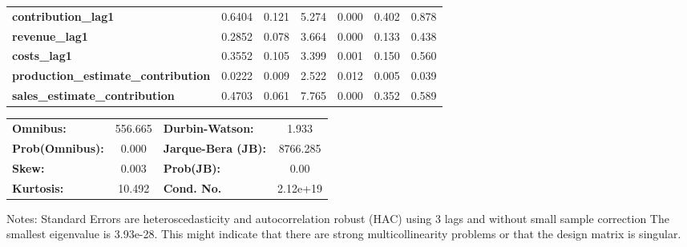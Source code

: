 \begin{center}
\begin{tabular}{lcccccc}
\textbf{contribution\_lag1}                 &       0.6404  &        0.121     &     5.274  &         0.000        &        0.402    &        0.878     \\
\textbf{revenue\_lag1}                      &       0.2852  &        0.078     &     3.664  &         0.000        &        0.133    &        0.438     \\
\textbf{costs\_lag1}                        &       0.3552  &        0.105     &     3.399  &         0.001        &        0.150    &        0.560     \\
\textbf{production\_estimate\_contribution} &       0.0222  &        0.009     &     2.522  &         0.012        &        0.005    &        0.039     \\
\textbf{sales\_estimate\_contribution}      &       0.4703  &        0.061     &     7.765  &         0.000        &        0.352    &        0.589     \\
\bottomrule
\end{tabular}
\begin{tabular}{lclc}
\textbf{Omnibus:}       & 556.665 & \textbf{  Durbin-Watson:     } &    1.933  \\
\textbf{Prob(Omnibus):} &   0.000 & \textbf{  Jarque-Bera (JB):  } & 8766.285  \\
\textbf{Skew:}          &   0.003 & \textbf{  Prob(JB):          } &     0.00  \\
\textbf{Kurtosis:}      &  10.492 & \textbf{  Cond. No.          } & 2.12e+19  \\
\bottomrule
\end{tabular}
\end{center}

Notes: \newline
 [1] Standard Errors are heteroscedasticity and autocorrelation robust (HAC) using 3 lags and without small sample correction \newline
 [2] The smallest eigenvalue is 3.93e-28. This might indicate that there are \newline
 strong multicollinearity problems or that the design matrix is singular.